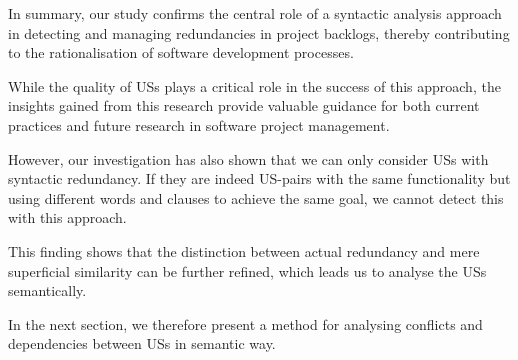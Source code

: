 In summary, our study confirms the central role of a syntactic analysis approach in detecting and managing redundancies in project backlogs, thereby contributing to the rationalisation of software development processes.

While the quality of USs plays a critical role in the success of this approach, the insights gained from this research provide valuable guidance for both current practices and future research in software project management.

However, our investigation has also shown that we can only consider USs with syntactic redundancy. If they are indeed US-pairs with the same functionality but using different words and clauses to achieve the same goal, we cannot detect this with this approach.

This finding shows that the distinction between actual redundancy and mere superficial similarity can be further refined, which leads us to analyse the USs semantically.

In the next section, we therefore present a method for analysing conflicts and dependencies between USs in semantic way.

%
